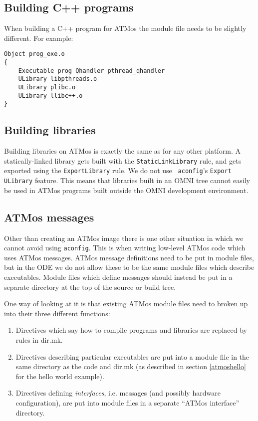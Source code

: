 \documentclass[11pt,twoside,onecolumn]{article}
\begin{document}
\subsection{Building C++ programs}

When building a C++ program for ATMos the module file needs to be slightly
different.  For example:

{\small \begin{verbatim}
Object prog_exe.o
{
    Executable prog Qhandler pthread_qhandler
    ULibrary libpthreads.o
    ULibrary plibc.o
    ULibrary llibc++.o
}
\end{verbatim}}

\subsection{Building libraries}

Building libraries on ATMos is exactly the same as for any other platform.  A
statically-linked library gets built with the \verb|StaticLinkLibrary| rule,
and gets exported using the \verb|ExportLibrary| rule.  We do not use {\tt
aconfig}'s {\tt Export ULibrary} feature.  This means that libraries built in
an OMNI tree cannot easily be used in ATMos programs built outside the OMNI
development environment.

\subsection{ATMos messages}
\label{atmosmessages}

Other than creating an ATMos image there is one other situation in which we
cannot avoid using {\tt aconfig}.  This is when writing low-level ATMos code
which uses ATMos messages.  ATMos message definitions need to be put in module
files, but in the ODE we do not allow these to be the same module files which
describe executables.  Module files which define messages should instead be put
in a separate directory at the top of the source or build tree.

One way of looking at it is that existing ATMos module files need to broken up
into their three different functions:

\begin{enumerate}
\item Directives which say how to compile programs and libraries are replaced
by rules in dir.mk.
\item Directives describing particular executables are put into a module file
in the same directory as the code and dir.mk (as described in section
\ref{atmoshello} for the hello world example).
\item Directives defining {\em interfaces}, i.e. messages (and possibly
hardware configuration), are put into module files in a separate ``ATMos
interface'' directory.
\end{enumerate}
\end{document}
